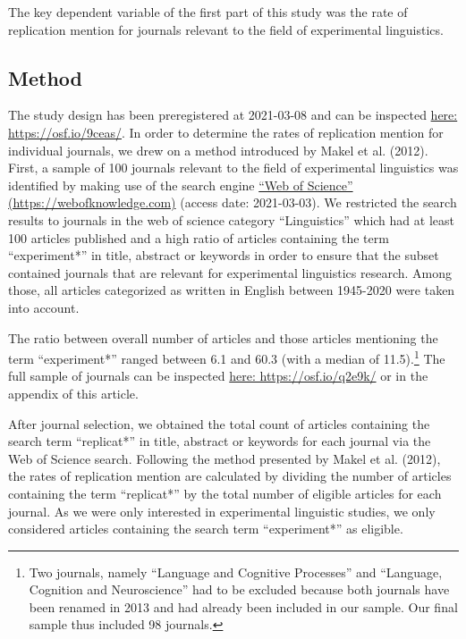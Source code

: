 \documentclass[]{elsarticle} %
\begin{document}
The key dependent variable of the first part of this study was the rate of replication mention for journals relevant to the field of experimental linguistics.

\hypertarget{method}{%
\subsection{Method}\label{method}}

The study design has been preregistered at 2021-03-08 and can be inspected \href{https://osf.io/9ceas/}{here: https://osf.io/9ceas/}.
In order to determine the rates of replication mention for individual journals, we drew on a method introduced by Makel et al. (2012).
First, a sample of 100 journals relevant to the field of experimental linguistics was identified by making use of the search engine \href{https://webofknowledge.com}{``Web of Science'' (https://webofknowledge.com)} (access date: 2021-03-03). We restricted the search results to journals in the web of science category ``Linguistics'' which had at least 100 articles published and a high ratio of articles containing the term ``experiment*'' in title, abstract or keywords in order to ensure that the subset contained journals that are relevant for experimental linguistics research. Among those, all articles categorized as written in English between 1945-2020 were taken into account.

The ratio between overall number of articles and those articles mentioning the term ``experiment*'' ranged between 6.1 and 60.3 (with a median of 11.5).\footnote{Two journals, namely ``Language and Cognitive Processes'' and ``Language, Cognition and Neuroscience'' had to be excluded because both journals have been renamed in 2013 and had already been included in our sample. Our final sample thus included 98 journals.}
The full sample of journals can be inspected \href{https://osf.io/q2e9k/}{here: https://osf.io/q2e9k/} or in the appendix of this article.

After journal selection, we obtained the total count of articles containing the search term ``replicat*'' in title, abstract or keywords for each journal via the Web of Science search.
Following the method presented by Makel et al. (2012), the rates of replication mention are calculated by dividing the number of articles containing the term ``replicat*'' by the total number of eligible articles for each journal. As we were only interested in experimental linguistic studies, we only considered articles containing the search term ``experiment*'' as eligible.
\end{document}
